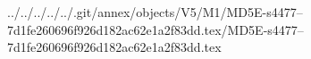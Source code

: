 ../../../../../.git/annex/objects/V5/M1/MD5E-s4477--7d1fe260696f926d182ac62e1a2f83dd.tex/MD5E-s4477--7d1fe260696f926d182ac62e1a2f83dd.tex